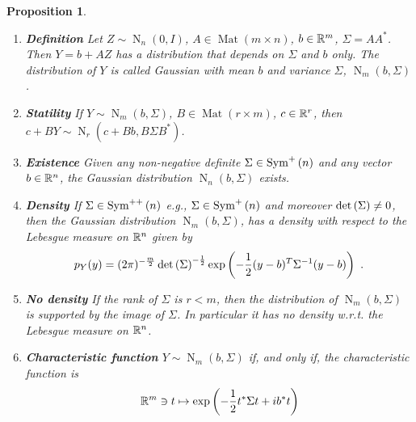 \documentclass[12pt,a4paper]{amsart}
\newcommand{\MRof}[2]{\operatorname{Mat}\left(#1\times#2\right)}
\newcommand{\gaussian}[3]{\operatorname{N}_{#1}\left(#2,#3\right)}
\theoremstyle{plain}%
\newtheorem{proposition}[thm]{Proposition}
\theoremstyle{definition}
\theoremstyle{remark}
\begin{document}
\begin{proposition}\ 
\begin{enumerate}
\item \label{item:uniqueness} \textbf{Definition}
  Let $Z \sim \gaussian n 0 I$, $A \in \MRof m n$, $b \in \mathbb{R}^m$, $\Sigma = AA^*$. Then $Y = b + AZ$ has a distribution that depends on $\Sigma$ and $b$ only. The distribution of $Y$ is called \emph{Gaussian with mean $b$ and variance $\Sigma$}, $\gaussian m b \Sigma$.
\item \textbf{Statility} If $Y \sim \gaussian m b \Sigma$, $B \in \MRof r m$, $c \in \mathbb{R}^r$, then $c + BY \sim \gaussian r {c+Bb} {B \Sigma B^*}$.
\item \textbf{Existence} Given any non-negative definite $\Sigma \in \operatorname{Sym}^{+}\left(n\right)$ and any vector $b \in \mathbb{R}^n$, the Gaussian distribution $\gaussian n b \Sigma$ exists.
\item \textbf{Density} If $\Sigma \in \operatorname{Sym}^{++}\left(n\right)$ e.g., $\Sigma \in \operatorname{Sym}^{+}\left(n\right)$ and moreover $\operatorname{det}\left(\Sigma\right) \ne 0$, then the Gaussian distribution $\gaussian m b \Sigma$, has a density with respect to the Lebesgue measure on $\mathbb{R}^n$ given by
%
  \begin{equation*}
 p_Y(y) = (2\pi)^{-\frac{m}2} \detof{\Sigma}^{-\frac12} \expof {-\frac12 (y-b)^T \Sigma^{-1}(y-b)} \ . 
  \end{equation*}
\item \textbf{No density} If the rank of $\Sigma$ is $r < m$, then the distribution of $\gaussian m b \Sigma$ is supported by the image of $\Sigma$. In particular it has no density w.r.t. the Lebesgue measure on $\mathbb{R}^n$.
\item \textbf{Characteristic function} $Y \sim \gaussian m b \Sigma$ if, and only if, the characteristic function is
  \begin{equation*}
    \mathbb{R}^m \ni t \mapsto \exp\left(-\frac12 t^* \Sigma t + i b^* t\right)
  \end{equation*}
\end{enumerate}
\end{proposition}
\end{document}
